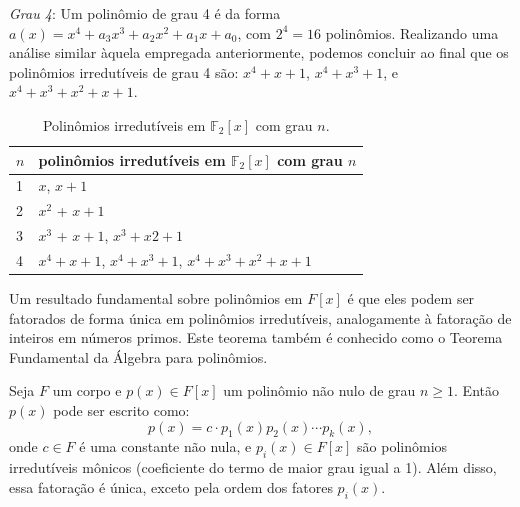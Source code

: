 \begin{example}
\emph{Grau 4}: Um polinômio de grau 4 é da forma
  $a(x) = x^4 + a_3 x^3 + a_2 x^2 + a_1 x + a_0$, com $2^4 = 16$ polinômios.
  Realizando uma análise similar àquela empregada anteriormente, podemos
  concluir ao final que os polinômios irredutíveis de grau 4 são:
  $x^4 + x + 1$, $x^4 + x^3 + 1$, e $x^4 + x^3 + x^2 + x + 1$.
\end{example}


\begin{table}
  \centering
  \caption{Polinômios irredutíveis em $\mathbb{F}_2[x]$ com grau $n$.}
  \begin{tabular}{ll}
    \toprule
    $n$ & polinômios irredutíveis em $\mathbb{F}_2[x]$ com grau $n$\\
    \midrule
    1   & $x$, $x + 1$\\
    2   & $x^2$ + $x + 1$\\
    3   & $x^3$ + $x + 1$, $x^3 + x2 + 1$\\
    4   & $x^4 + x + 1$, $x^4 + x^3 + 1$, $x^4 + x^3 + x^2 + x + 1$\\
    \bottomrule
  \end{tabular}
\end{table}



Um resultado fundamental sobre polinômios em $F[x]$ é que eles podem ser
fatorados de forma única em polinômios irredutíveis, analogamente à fatoração
de inteiros em números primos. Este teorema também é conhecido como o Teorema
Fundamental da Álgebra para polinômios.

\begin{theorem}
  Seja $F$ um corpo e $p(x) \in F[x]$ um polinômio não nulo de grau $n \geq 1$.
  Então $p(x)$ pode ser escrito como:
  \begin{equation}
  p(x) = c \cdot p_1(x) p_2(x) \cdots p_k(x),
  \end{equation}
  onde $c \in F$ é uma constante não nula, e $p_i(x) \in F[x]$ são polinômios
  irredutíveis mônicos (coeficiente do termo de maior grau igual a 1). Além
  disso, essa fatoração é única, exceto pela ordem dos fatores $p_i(x)$.
\end{theorem}

